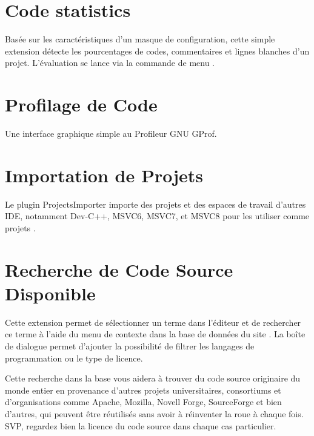 \section{Code statistics}


Basée sur les caractéristiques d'un masque de configuration, cette simple extension détecte les pourcentages de codes, commentaires et lignes blanches d'un projet. L'évaluation se lance via la commande de menu .


\section{Profilage de Code}

Une interface graphique simple au Profileur GNU GProf.


\section{Importation de Projets}

Le plugin ProjectsImporter importe des projets et des espaces de travail d'autres IDE, notamment Dev-C++, MSVC6, MSVC7, et MSVC8 pour les utiliser comme projets \codeblocks. 


\section{Recherche de Code Source Disponible}

Cette extension permet de sélectionner un terme dans l'éditeur et de rechercher ce terme à l'aide du menu de contexte  dans la base de données du site \cite{url:koders}. La boîte de dialogue permet d'ajouter la possibilité de filtrer les langages de programmation ou le type de licence.


Cette recherche dans la base vous aidera à trouver du code source originaire du monde entier en provenance d'autres projets universitaires, consortiums et d'organisations comme Apache, Mozilla, Novell Forge, SourceForge et bien d'autres, qui peuvent être réutilisés sans avoir à réinventer la roue à chaque fois. SVP, regardez bien la licence du code source dans chaque cas particulier.



